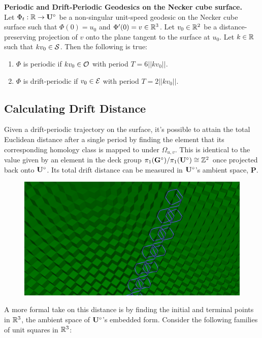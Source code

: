 \documentclass[a4paper, 11pt]{article}
\begin{document}
\begin{thm*} \textbf{Periodic and Drift-Periodic Geodesics on the Necker cube surface.} 
\\Let $\Phi_t:\mathbb{R}\rightarrow\mathbf{U}^\circ$ be a non-singular unit-speed geodesic on the Necker cube surface such that $\Phi(0)=u_0$ and $\Phi'(0)=v\in\mathbb{R}^3$. Let $v_0\in\mathbb{R}^2$ be a distance-preserving projection of $v$ onto the plane tangent to the surface at $u_0$. Let $k\in\mathbb{R}$ such that $kv_0\in\mathcal{S}$. Then the following is true:
\begin{enumerate}[label=(\roman*)]
\item $\Phi$ is periodic if $kv_0\in\mathcal{O}$ with period $T=6||kv_0||$.
\item $\Phi$ is drift-periodic if $v_0\in\mathcal{E}$ with period $T=2||kv_0||$.
\end{enumerate}
\end{thm*}


\subsection{Calculating Drift Distance}
Given a drift-periodic trajectory on the surface, it's possible to attain the total Euclidean distance after a single period by finding the element that its corresponding homology class is mapped to under $\Omega_{u,v}$. This is identical to the value given by an element in the deck group $\pi_1(\mathbf{G}^\circ)/\pi_1(\mathbf{U}^\circ)\cong\mathbb{Z}^2$ once projected back onto $\mathbf{U}^\circ$. Its total drift distance can be measured in $\mathbf{U}^\circ$'s ambient space, $\mathbf{P}$.
\begin{figure}[H]
\centering
\includegraphics[width=5in]{drift1.png}
\end{figure}
\noindent A more formal take on this distance is by finding the initial and terminal points in $\mathbb{R}^3$, the ambient space of $\mathbf{U}^\circ$'s embedded form. Consider the following families of unit squares in $\mathbb{R}^3$:\\
\end{document}
